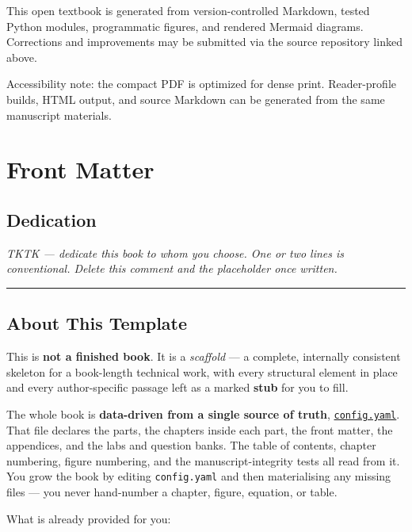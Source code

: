 \documentclass[
]{article}
\theoremstyle{plain}
\theoremstyle{definition}
\begin{document}
\vspace{1.0em}
\noindent This open textbook is generated from version-controlled Markdown, tested Python modules, programmatic figures, and rendered Mermaid diagrams. Corrections and improvements may be submitted via the source repository linked above.

\vfill
\noindent Accessibility note: the compact PDF is optimized for dense print. Reader-profile builds, HTML output, and source Markdown can be generated from the same manuscript materials.
\clearpage
\tableofcontents
\clearpage


\section{Front Matter}\label{front-matter}

\subsection{Dedication}\label{dedication}

\emph{TKTK --- dedicate this book to whom you choose. One or two lines
is conventional. Delete this comment and the placeholder once written.}

\begin{center}\rule{0.5\linewidth}{0.5pt}\end{center}

\subsection{About This Template}\label{about-this-template}

This is \textbf{not a finished book}. It is a \emph{scaffold} --- a
complete, internally consistent skeleton for a book-length technical
work, with every structural element in place and every author-specific
passage left as a marked \textbf{stub} for you to fill.

The whole book is \textbf{data-driven from a single source of truth},
\href{config.yaml}{\texttt{config.yaml}}. That file declares the parts,
the chapters inside each part, the front matter, the appendices, and the
labs and question banks. The table of contents, chapter numbering,
figure numbering, and the manuscript-integrity tests all read from it.
You grow the book by editing \texttt{config.yaml} and then materialising
any missing files --- you never hand-number a chapter, figure, equation,
or table.

What is already provided for you:
\end{document}
